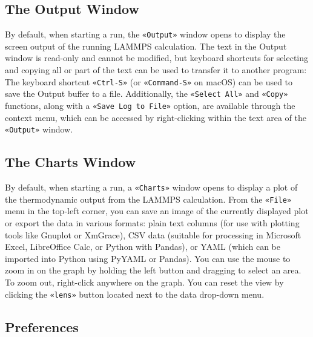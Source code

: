 \documentclass[9pt,tutorial]{livecoms}
\newcommand{\guicmd}[1]{\textcolor{command}{\texttt{«#1»}}} %
\begin{document}
\begin{appendices}
\subsection{The Output Window}

By default, when starting a run, the \guicmd{Output} window opens to display the screen
output of the running LAMMPS calculation.  The text in the Output window is
read-only and cannot be modified, but keyboard shortcuts for selecting and
copying all or part of the text can be used to transfer it to another program:
The keyboard shortcut \guicmd{Ctrl-S} (or \guicmd{Command-S} on {macOS}) can
be used to save the Output buffer to a file.  Additionally, the \guicmd{Select All}
and \guicmd{Copy} functions, along with a \guicmd{Save Log to File} option, are available
through the context menu, which can be accessed by right-clicking within the text area of the
\guicmd{Output} window.

\subsection{The Charts Window}

By default, when starting a run, a \guicmd{Charts} window opens to display
a plot of the thermodynamic output from the LAMMPS calculation.  From the \guicmd{File}
menu in the top-left corner, you can save an image of the
currently displayed plot or export the data in various formats:
plain text columns (for use with plotting tools like Gnuplot or XmGrace),
CSV data (suitable for processing in Microsoft Excel, LibreOffice Calc,
or Python with Pandas), or YAML (which can be imported into Python using PyYAML or Pandas).
You can use the mouse to zoom in on the graph by holding the left button and dragging
to select an area.  To zoom out, right-click anywhere on the graph.  You can reset the view
by clicking the \guicmd{lens} button located next to the data drop-down menu.

\subsection{Preferences}


\end{appendices}
\end{document}
